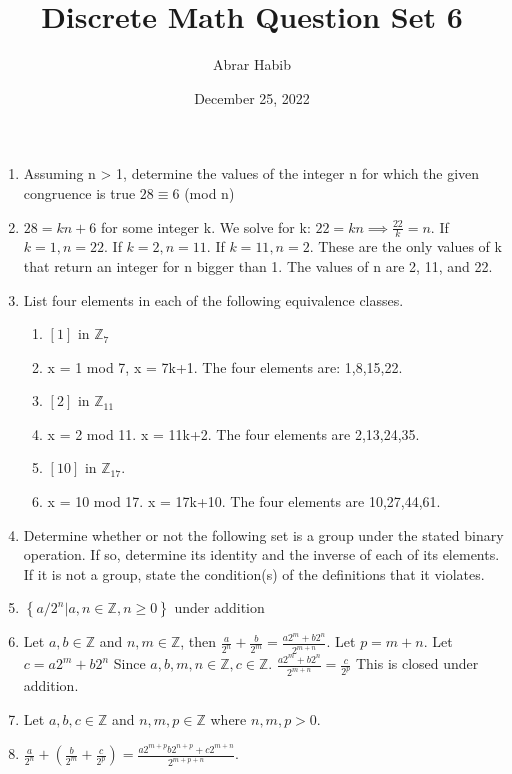 \documentclass[letterpaper,11pt]{article}
\begin{document}
\title{Discrete Math Question Set 6}
\author{Abrar Habib}
\date{December 25, 2022}
\maketitle

\begin{enumerate}
    \item Assuming n > 1, determine the values of the integer n for which the given congruence is true $28 \equiv 6$ (mod n)
    \item [] $28=kn+6$ for some integer k. We solve for k: $22=kn \implies \frac{22}{k}=n$. If $k=1, n=22$. If $k=2, n=11$. If $k=11,n=2$. These are the only values of k that return an integer for n bigger than 1. The values of n are 2, 11, and 22.
    \item List four elements in each of the following equivalence classes.
    \begin{enumerate}
        \item $\left[1\right]$ in $\mathbb{Z}_7$ 
        \item [] x = 1 mod 7, x = 7k+1. The four elements are: 1,8,15,22.
        \item $\left[2\right]$ in $\mathbb{Z}_11$
        \item [] x = 2 mod 11. x = 11k+2. The four elements are 2,13,24,35.
        \item $\left[10\right]$ in $\mathbb{Z}_17$.
        \item [] x = 10 mod 17. x = 17k+10. The four elements are 10,27,44,61. 
    \end{enumerate}
    \item Determine whether or not the following set is a group under the stated binary operation. If so, determine its
    identity and the inverse of each of its elements. If it is not a group, state the condition(s) of the definitions that
    it violates.
    \item[] $\left\lbrace a/2^n|a, n \in \mathbb{Z}, n \geq 0 \right\rbrace$ under addition
    \item[] Let $a, b \in \mathbb{Z}$ and $n, m \in \mathbb{Z}$, then $\frac{a}{2^n} + \frac{b}{2^m} = \frac{a2^m + b2^n}{2^{m+n}}.$ Let $p = m+n$. Let $c = a2^m + b2^n$ Since $a,b,m,n \in \mathbb{Z}, c \in \mathbb{Z}.$ $\frac{a2^m + b2^n}{2^{m+n}} = \frac{c}{2^p}$ This is closed under addition.
    \item[] Let $a,b,c \in \mathbb{Z}$ and $n,m,p \in \mathbb{Z}$ where $n,m,p > 0.$ 
    \item[] $\frac{a}{2^n} + (\frac{b}{2^m} + \frac{c}{2^p}) = \frac{a2^{m+p}b2^{n+p}+c2^{m+n}}{2^{m+p+n}}$.

\end{enumerate}
\end{document}
